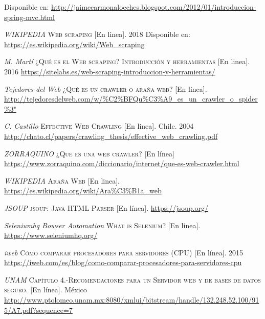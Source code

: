 \begin{thebibliography}{}
	Disponible en: 
	\url{http://jaimecarmonaloeches.blogspot.com/2012/01/introduccion-spring-mvc.html}
	
	\textit{WIKIPEDIA}
	\textsc{Web scraping} 
	[En linea]. 2018
	Disponible en:
	\url{https://es.wikipedia.org/wiki/Web_scraping}     
	
	\textit{M. Martí}
	\textsc{¿Qué es el Web scraping? Introducción y herramientas}
	[En linea]. 2016
	\url{https://sitelabs.es/web-scraping-introduccion-y-herramientas/}
	
	\textit{Tejedores del Web}
	\textsc{¿Qué es un crawler o araña web?}
	[En linea]. 
	\url{http://tejedoresdelweb.com/w/\%C2\%BFQu\%C3\%A9_es_un_crawler_o_spider\%3"}   
	
	\textit{C. Castillo}
	\textsc{Effective Web Crawling}
	[En linea]. Chile. 2004
	\url{http://chato.cl/papers/crawling_thesis/effective_web_crawling.pdf}
	
	\textit{ZORRAQUINO}
	\textsc{¿Que es una web crawler?}
	[En línea]
	\url{https://www.zorraquino.com/diccionario/internet/que-es-web-crawler.html}
	
	\textit{WIKIPEDIA}
	\textsc{Araña Web}
	[En linea].
	\newline
	\url{https://es.wikipedia.org/wiki/Ara\%C3\%B1a_web}
	
	\textit{JSOUP}
	\textsc{jsoup: Java HTML Parser}
	[En línea].
	\newline
	\url{https://jsoup.org/}
	
	\textit{Seleniumhq Bowser Automation}
	\textsc{What is Selenium?}
	[En línea].
	\newline
	\url{https://www.seleniumhq.org/}
	
	\textit{iweb}
	\textsc{Cómo comparar procesadores para servidores (CPU)}
	[En línea]. 2015
	\newline
	\url{https://iweb.com/es/blog/como-comparar-procesadores-para-servidores-cpu}
	
	\textit{UNAM}
	\textsc{Capítulo 4.-Recomendaciones para un Servidor web y de bases de datos seguro.}
	[En línea]. México
	\newline
	\url{http://www.ptolomeo.unam.mx:8080/xmlui/bitstream/handle/132.248.52.100/915/A7.pdf?sequence=7}
	

\end{thebibliography}
